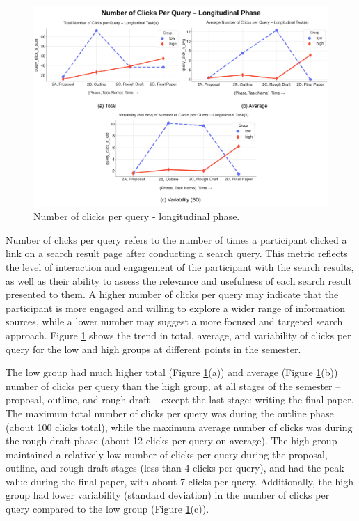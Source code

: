 \documentclass[letterpaper, nobind]{templates/ociamthesis}
\begin{document}
\begin{figure}

{\centering \includegraphics[width=1\linewidth]{figs/rp2-query-click} 

}

\caption[Number of clicks per query - longitudinal phase.]{Number of clicks per query - longitudinal phase.}\label{fig:rp2-query-click}
\end{figure}





Number of clicks per query refers to the number of times a participant clicked a link on a search result page after conducting a search query.
This metric reflects the level of interaction and engagement of the participant with the search results, as well as their ability to assess the relevance and usefulness of each search result presented to them.
A higher number of clicks per query may indicate that the participant is more engaged and willing to explore a wider range of information sources, while a lower number may suggest a more focused and targeted search approach.
Figure \ref{fig:rp2-query-click} shows the trend in total, average, and variability of clicks per query for the low and high groups at different points in the semester.

The low group had much higher total (Figure \ref{fig:rp2-query-click}(a)) and average (Figure \ref{fig:rp2-query-click}(b)) number of clicks per query than the high group, at all stages of the semester -- proposal, outline, and rough draft -- except the last stage: writing the final paper.
The maximum total number of clicks per query was during the outline phase (about 100 clicks total), while the maximum average number of clicks was during the rough draft phase (about 12 clicks per query on average).
The high group maintained a relatively low number of clicks per query during the proposal, outline, and rough draft stages (less than 4 clicks per query), and had the peak value during the final paper, with about 7 clicks per query.
Additionally, the high group had lower variability (standard deviation) in the number of clicks per query compared to the low group (Figure \ref{fig:rp2-query-click}(c)).
\end{document}
